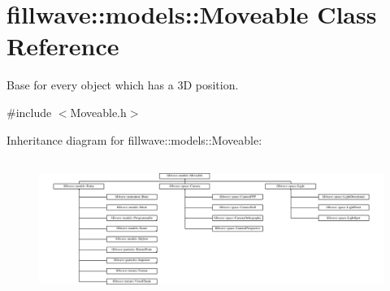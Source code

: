 \hypertarget{classfillwave_1_1models_1_1Moveable}{}\section{fillwave\+:\+:models\+:\+:Moveable Class Reference}
\label{classfillwave_1_1models_1_1Moveable}


Base for every object which has a 3\+D position.  




{\ttfamily \#include $<$Moveable.\+h$>$}

Inheritance diagram for fillwave\+:\+:models\+:\+:Moveable\+:\begin{figure}[H]
\begin{center}
\leavevmode
\includegraphics[height=4.502924cm]{classfillwave_1_1models_1_1Moveable}
\end{center}
\end{figure}
